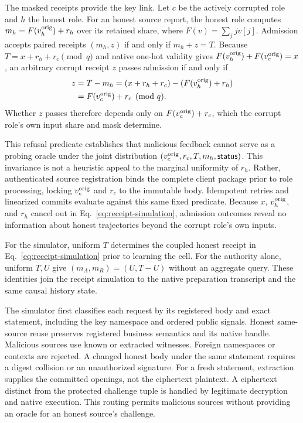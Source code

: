 \documentclass[conference,compsoc]{IEEEtran}
\theoremstyle{definition}
\numberwithin{equation}{section}
\numberwithin{table}{section}
\numberwithin{figure}{section}
\theoremstyle{plain}
\begin{document}
The masked receipts provide the key link. Let \(c\) be the actively corrupted role
and \(h\) the honest role. For an honest source report, the honest role computes
\(m_h = F(v_h^{\rm orig}) + r_h\) over its retained share, where \(F(v) = \sum_j j v[j]\).
Admission accepts paired receipts \((m_h, z)\) if and only if \(m_h + z = T\). Because
\(T = x + r_h + r_c \pmod q\) and native one-hot validity gives \(F(v_h^{\rm orig}) + F(v_c^{\rm orig}) = x\),
an arbitrary corrupt receipt \(z\) passes admission if and only if
\begin{equation}
\begin{aligned}
 z &= T - m_h = (x + r_h + r_c) - (F(v_h^{\rm orig}) + r_h) \\
   &= F(v_c^{\rm orig}) + r_c \pmod q.
\end{aligned}
 \label{eq:receipt-simulation}
\end{equation}
Whether \(z\) passes therefore depends only on \(F(v_c^{\rm orig}) + r_c\), which the corrupt
role's own input share and mask determine.

This refusal predicate establishes that malicious feedback cannot serve as a probing oracle
under the joint distribution \((v_c^{\rm orig}, r_c, T, m_h, \mathsf{status})\). This invariance is not
a heuristic appeal to the marginal uniformity of \(r_h\). Rather, authenticated source registration
binds the complete client package prior to role processing, locking \(v_c^{\rm orig}\) and \(r_c\)
to the immutable body. Idempotent retries and linearized commits evaluate against
this same fixed predicate. Because \(x\), \(v_h^{\rm orig}\), and \(r_h\) cancel out
in Eq.~\eqref{eq:receipt-simulation}, admission outcomes reveal no information
about honest trajectories beyond the corrupt role's own inputs.

For the simulator, uniform \(T\) determines the coupled honest receipt in Eq.~\eqref{eq:receipt-simulation}
prior to learning the cell. For the authority alone, uniform \(T, U\) give \((m_A, m_R) = (U, T-U)\) without
an aggregate query. These identities join the receipt simulation to the native preparation transcript and
the same causal history state.

The simulator first classifies each request by its registered body and exact
statement, including the key namespace and ordered public signals. Honest
same-source reuse preserves registered business semantics and its native handle.
Malicious sources use known or extracted witnesses. Foreign namespaces or
contexts are rejected. A changed honest body under the same statement
requires a digest collision or an unauthorized signature. For a fresh
statement, extraction supplies the committed openings, not the ciphertext
plaintext. A ciphertext distinct from the protected challenge tuple is handled
by legitimate decryption and native execution. This routing permits malicious
sources without providing an oracle for an honest source's challenge.
\end{document}
